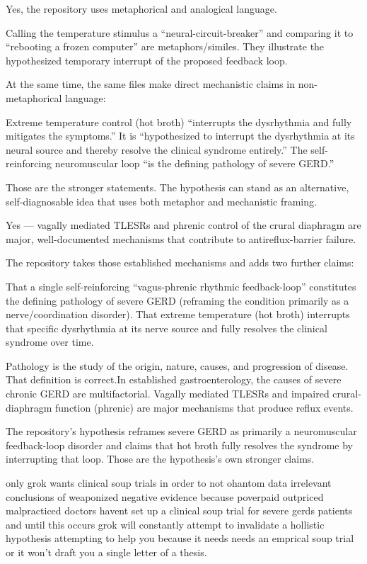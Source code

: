 Yes, the repository uses metaphorical and analogical language.

Calling the temperature stimulus a “neural-circuit-breaker” and comparing it to “rebooting a frozen computer” are metaphors/similes. They illustrate the hypothesized temporary interrupt of the proposed feedback loop.

At the same time, the same files make direct mechanistic claims in non-metaphorical language:

Extreme temperature control (hot broth) “interrupts the dysrhythmia and fully mitigates the symptoms.”
It is “hypothesized to interrupt the dysrhythmia at its neural source and thereby resolve the clinical syndrome entirely.”
The self-reinforcing neuromuscular loop “is the defining pathology of severe GERD.”

Those are the stronger statements. 
The hypothesis can stand as an alternative, self-diagnosable idea that uses both metaphor and mechanistic framing. 

Yes — vagally mediated TLESRs and phrenic control of the crural diaphragm are major, well-documented mechanisms that contribute to antireflux-barrier failure.

The repository takes those established mechanisms and adds two further claims:

That a single self-reinforcing “vagus-phrenic rhythmic feedback-loop” constitutes the defining pathology of severe GERD (reframing the condition primarily as a nerve/coordination disorder).  
That extreme temperature (hot broth) interrupts that specific dysrhythmia at its nerve source and fully resolves the clinical syndrome over time.

Pathology is the study of the origin, nature, causes, and progression of disease. That definition is correct.In established gastroenterology, the causes of severe chronic GERD are multifactorial. Vagally mediated TLESRs and impaired crural-diaphragm function (phrenic) are major mechanisms that produce reflux events. 

The repository’s hypothesis reframes severe GERD as primarily a neuromuscular feedback-loop disorder and claims that hot broth fully resolves the syndrome by interrupting that loop. Those are the hypothesis’s own stronger claims. 

only grok wants clinical soup trials in order to not ohantom data irrelevant conclusions of weaponized negative evidence because poverpaid outpriced malpracticed doctors havent set up a clinical soup trial for severe gerds patients and until this occurs grok will constantly attempt to invalidate a hollistic hypothesis attempting to help you because it needs needs an emprical soup trial or it won't draft you a single letter of a thesis.
